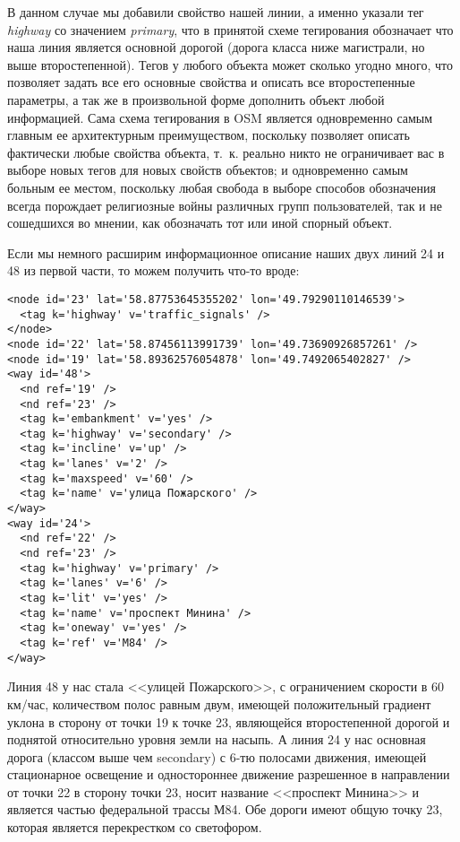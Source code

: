 В данном случае мы добавили свойство нашей линии, а именно указали тег 
\emph{highway} со значением \emph{primary}, что в принятой схеме тегирования 
обозначает что наша линия является основной дорогой (дорога класса ниже 
магистрали, но выше второстепенной). Тегов у любого объекта может сколько 
угодно много, что позволяет задать все его основные свойства и описать все 
второстепенные параметры, а так же в произвольной форме дополнить объект любой 
информацией. Сама схема тегирования в OSM является одновременно самым главным 
ее архитектурным преимуществом, поскольку позволяет описать фактически любые 
свойства объекта, т.~к. реально никто не ограничивает вас в выборе новых тегов 
для новых свойств объектов; и одновременно самым больным ее местом, поскольку 
любая свобода в выборе способов обозначения всегда порождает религиозные войны 
различных групп пользователей, так и не сошедшихся во мнении, как обозначать 
тот или иной спорный объект.

Если мы немного расширим информационное описание наших двух линий 24 и 48 из 
первой части, то можем получить что-то вроде:

\small
\begin{verbatim}
<node id='23' lat='58.87753645355202' lon='49.79290110146539'>
  <tag k='highway' v='traffic_signals' />
</node>
<node id='22' lat='58.87456113991739' lon='49.73690926857261' />
<node id='19' lat='58.89362576054878' lon='49.7492065402827' />
<way id='48'>
  <nd ref='19' />
  <nd ref='23' />
  <tag k='embankment' v='yes' />
  <tag k='highway' v='secondary' />
  <tag k='incline' v='up' />
  <tag k='lanes' v='2' />
  <tag k='maxspeed' v='60' />
  <tag k='name' v='улица Пожарского' />
</way>
<way id='24'>
  <nd ref='22' />
  <nd ref='23' />
  <tag k='highway' v='primary' />
  <tag k='lanes' v='6' />
  <tag k='lit' v='yes' />
  <tag k='name' v='проспект Минина' />
  <tag k='oneway' v='yes' />
  <tag k='ref' v='М84' />
</way>
\end{verbatim}
\normalsize

Линия 48 у нас стала <<улицей Пожарского>>, с ограничением скорости в 
60 км/час, количеством полос равным двум, имеющей положительный градиент 
уклона в сторону от точки 19 к точке 23, являющейся второстепенной дорогой и 
поднятой относительно уровня земли на насыпь. А линия 24 у нас основная дорога 
(классом выше чем secondary) с 6-тю полосами движения, имеющей стационарное 
освещение и одностороннее движение разрешенное в направлении от точки 22 в 
сторону точки 23, носит название <<проспект Минина>> и является частью 
федеральной трассы М84. Обе дороги имеют общую точку 23, которая является 
перекрестком со светофором. \cite{habrahabr02}

